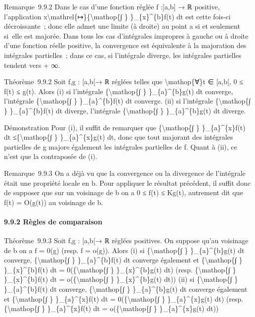 \documentclass[]{article}
\begin{document}
Remarque~9.9.2 Dans le cas d'une fonction réglée f :{]}a,b{]} → ℝ
positive, l'application
x\textbackslash{}mathrel\{↦\}\{\textbackslash{}mathop\{∫ \}
\}\_\{x\}\^{}\{b\}f(t) dt est cette fois-ci décroissante~; donc elle
admet une limite (à droite) au point a si et seulement si~elle est
majorée. Dans tous les cas d'intégrales impropres à gauche ou à droite
d'une fonction réelle positive, la convergence est équivalente à la
majoration des intégrales partielles~; dans ce cas, si l'intégrale
diverge, les intégrales partielles tendent vers + ∞.

Théorème~9.9.2 Soit f,g : {[}a,b{[}→ ℝ réglées telles que
\textbackslash{}mathop\{∀\}t ∈ {[}a,b{[}, 0 ≤ f(t) ≤ g(t). Alors (i) si
l'intégrale \{\textbackslash{}mathop\{∫ \} \}\_\{a\}\^{}\{b\}g(t) dt
converge, l'intégrale \{\textbackslash{}mathop\{∫ \}
\}\_\{a\}\^{}\{b\}f(t) dt converge. (ii) si l'intégrale
\{\textbackslash{}mathop\{∫ \} \}\_\{a\}\^{}\{b\}f(t) dt diverge,
l'intégrale \{\textbackslash{}mathop\{∫ \} \}\_\{a\}\^{}\{b\}g(t) dt
diverge.

Démonstration Pour (i), il suffit de remarquer que
\{\textbackslash{}mathop\{∫ \} \}\_\{a\}\^{}\{x\}f(t) dt
≤\{\textbackslash{}mathop\{∫ \} \}\_\{a\}\^{}\{x\}g(t) dt, donc que tout
majorant des intégrales partielles de g majore également les intégrales
partielles de f. Quant à (ii), ce n'est que la contraposée de (i).

Remarque~9.9.3 On a déjà vu que la convergence ou la divergence de
l'intégrale était une propriété locale en b. Pour appliquer le résultat
précédent, il suffit donc de supposer que sur un voisinage de b on a 0 ≤
f(t) ≤ Kg(t), autrement dit que f(t) = O(g(t)) au voisinage de b.

\paragraph{9.9.2 Règles de comparaison}

Théorème~9.9.3 Soit f,g : {[}a,b{[}→ ℝ réglées positives. On suppose
qu'au voisinage de b on a f = 0(g) (resp. f = o(g)). Alors (i) si
\{\textbackslash{}mathop\{∫ \} \}\_\{a\}\^{}\{b\}g(t) dt converge,
\{\textbackslash{}mathop\{∫ \} \}\_\{a\}\^{}\{b\}f(t) dt converge
également et \{\textbackslash{}mathop\{∫ \} \}\_\{x\}\^{}\{b\}f(t) dt =
0(\{\textbackslash{}mathop\{∫ \} \}\_\{x\}\^{}\{b\}g(t) dt) (resp.
\{\textbackslash{}mathop\{∫ \} \}\_\{x\}\^{}\{b\}f(t) dt =
o(\{\textbackslash{}mathop\{∫ \} \}\_\{x\}\^{}\{b\}g(t) dt)) (ii) si
\{\textbackslash{}mathop\{∫ \} \}\_\{a\}\^{}\{b\}f(t) dt converge,
\{\textbackslash{}mathop\{∫ \} \}\_\{a\}\^{}\{b\}g(t) dt converge
également et \{\textbackslash{}mathop\{∫ \} \}\_\{a\}\^{}\{x\}f(t) dt =
0(\{\textbackslash{}mathop\{∫ \} \}\_\{a\}\^{}\{x\}g(t) dt) (resp.
\{\textbackslash{}mathop\{∫ \} \}\_\{a\}\^{}\{x\}f(t) dt =
o(\{\textbackslash{}mathop\{∫ \} \}\_\{a\}\^{}\{x\}g(t) dt))
\end{document}
